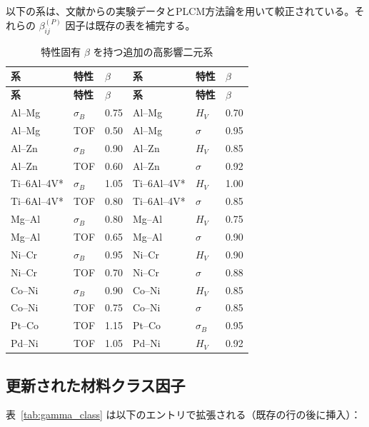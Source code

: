 \documentclass[12pt,a4paper]{article}
\begin{document}
	以下の系は、文献からの実験データとPLCM方法論を用いて較正されている。それらの $\beta_{ij}^{(P)}$ 因子は既存の表を補完する。
	
	\begin{longtable}{p{2.2cm} p{2.2cm} p{1.2cm} p{2.2cm} p{2.2cm} p{1.2cm}}
		\caption{特性固有 $\beta$ を持つ追加の高影響二元系}\label{tab:beta_additional}\\
		\toprule
		\textbf{系} & \textbf{特性} & $\beta$ & \textbf{系} & \textbf{特性} & $\beta$ \\
		\midrule
		\endfirsthead
		\toprule
		\textbf{系} & \textbf{特性} & $\beta$ & \textbf{系} & \textbf{特性} & $\beta$ \\
		\midrule
		\endhead
		Al–Mg & $\sigma_B$ & 0.75 & Al–Mg & $H_V$ & 0.70 \\
		Al–Mg & TOF & 0.50 & Al–Mg & $\sigma$ & 0.95 \\
		Al–Zn & $\sigma_B$ & 0.90 & Al–Zn & $H_V$ & 0.85 \\
		Al–Zn & TOF & 0.60 & Al–Zn & $\sigma$ & 0.92 \\
		Ti–6Al–4V* & $\sigma_B$ & 1.05 & Ti–6Al–4V* & $H_V$ & 1.00 \\
		Ti–6Al–4V* & TOF & 0.80 & Ti–6Al–4V* & $\sigma$ & 0.85 \\
		Mg–Al & $\sigma_B$ & 0.80 & Mg–Al & $H_V$ & 0.75 \\
		Mg–Al & TOF & 0.65 & Mg–Al & $\sigma$ & 0.90 \\
		Ni–Cr & $\sigma_B$ & 0.95 & Ni–Cr & $H_V$ & 0.90 \\
		Ni–Cr & TOF & 0.70 & Ni–Cr & $\sigma$ & 0.88 \\
		Co–Ni & $\sigma_B$ & 0.90 & Co–Ni & $H_V$ & 0.85 \\
		Co–Ni & TOF & 0.75 & Co–Ni & $\sigma$ & 0.85 \\
		Pt–Co & TOF & 1.15 & Pt–Co & $\sigma_B$ & 0.95 \\
		Pd–Ni & TOF & 1.05 & Pd–Ni & $H_V$ & 0.92 \\
		\bottomrule
	\end{longtable}
	\vspace{0.2cm}
	
	\subsection*{更新された材料クラス因子}
	表~\ref{tab:gamma_class} は以下のエントリで拡張される（既存の行の後に挿入）：
	
\end{document}
